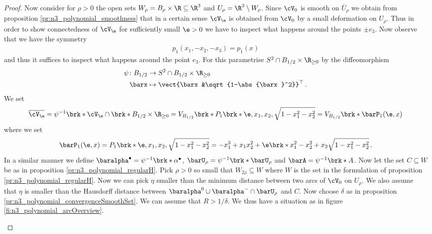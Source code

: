 \begin{proof}
  Now consider for $\rho>0$ the open sets $W_\rho=B_\rho\times\R\subseteq\R^3$ and $U_\rho=\R^3\setminus W_\rho$.
  Since $\cV_0$ is smooth on $\overline{U}_\rho$ we obtain from proposition \ref{pr:n3_polynomial_smoothness}
  that in a certain sense $\cV_\e$ is obtained from $\cV_0$ by a small deformation on $U_\rho$.
  Thus in order to show connectedness of $\cV_\e$ for sufficiently small $\e>0$ we have to inspect what happens
  around the points $\pm e_3$.
  Now observe that we have the symmetry
  \begin{align}
    p_1(x_1,-x_2,-x_3)=p_1(x)\label{eq:n3_polynomial_smoothConnected_symmetr}
  \end{align}
  and thus it suffices to inspect what happens around the point $e_3$.
  For this parametrise $S^2\cap B_{1/2}\times\R_{\geq0}$
  by the diffeomorphism
  \begin{align*}
    \psi\colon B_{1/2}&\to S^2\cap B_{1/2}\times\R_{\geq0}\\
    \barx&\mapsto \vect{\barx&\sqrt{1-\abs{\barx}^2}}^\top\,.
  \end{align*}
  We set
  \begin{align*}
    \overline{\cV_\e}=\psi^{-1}\brk*{\cV_\e\cap \brk*{B_{1/2}\times\R_{\geq0}}}
    =V_{B_{1/2}}\brk*{P_1\brk*{\e,x_1,x_2,\sqrt{1-x_1^2-x_2^2}}}
    =V_{B_{1/2}}\brk*{\barP_1(\e,x)}
  \end{align*}
  where we set
  \begin{align*}
    \barP_1(\e,x)=P_1\brk*{\e,x_1,x_2,\sqrt{1-x_1^2-x_2^2}}
    =-x_1^3+x_1x_2^2+\e\brk*{x_1^2-x_2^2+x_2\sqrt{1-x_1^2-x_2^2}}\,.
  \end{align*}
  In a similar manner we define $\baralpha^\bullet=\psi^{-1}\brk*{\alpha^\bullet}$, $\barU_\rho=\psi^{-1}\brk*{\barU_\rho}$
  and $\barA=\psi^{-1}\brk*{A}$.
  Now let the set $C\subseteq W$ be as in proposition \ref{pr:n3_polynomial_regularH}.
  Pick $\rho>0$ so small that $W_{2\rho}\subseteq W$ where $W$ is the set in the formulation of proposition
  \ref{pr:n3_polynomial_regularH}. 
  Now we can pick $\eta$ smaller than the minimum distance between two arcs of $\cV_0$ on $U_{\rho}$.
  We also assume that $\eta$ is smaller than the Hausdorff distance between $\baralpha^0\cup\baralpha^-\cap\barU_\rho$
  and $C$.
  Now choose $\delta$ as in proposition \ref{pr:n3_polynomial_convergenceSmoothSet}. We can assume that $R>1/\delta$.
  We thus have a situation as in figure \ref{fi:n3_polynomial_arcOverview}.
  \begin{figure}
    \centering
    

\end{figure}
\end{proof}
